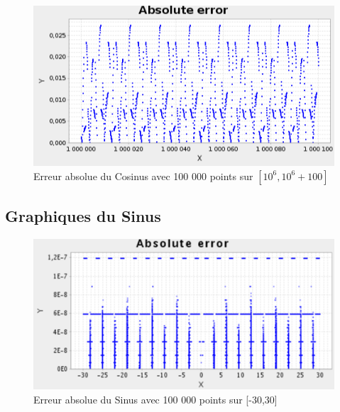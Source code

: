 \documentclass[12pt]{article}
\begin{document}
\begin{figure}[h!]
  \begin{center}
    \includegraphics[scale=0.33]{ErrorAbsCosMiniFar.png}
    \caption{Erreur absolue du Cosinus avec 100 000 points sur $[10^6,10^6+100]$}
    \label{Erreur absolue du Cosinus avec 100 000 points sur $[10^6,10^6+100]$}
  \end{center}
\end{figure}

\newpage
\subsection{Graphiques du Sinus}

\begin{figure}[h!]
  \begin{center}
    \includegraphics[scale=0.33]{sinus_abs.png}
    \caption{Erreur absolue du Sinus avec 100 000 points sur [-30,30]}
    \label{Erreur absolue du Sinus avec 100 000 points sur [-30,30]}
  \end{center}
\end{figure}

\newpage
\end{document}
